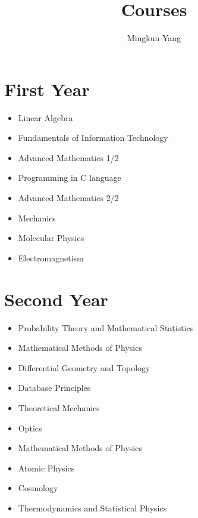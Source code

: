 \documentclass{article}
\begin{document}
\title{Courses}
\author{Mingkun Yang}
\maketitle

\section{First Year}
\begin{itemize}
	\item
		Linear Algebra
	\item
		Fundamentals of Information Technology
	\item
		Advanced Mathematics 1/2
	\item
		Programming in C language
	\item
		Advanced Mathematics 2/2
	\item
		Mechanics
	\item
		Molecular Physics
	\item
		Electromagnetism
\end{itemize}

\section{Second Year}
\begin{itemize}
	\item
		Probability Theory and Mathematical Statistics
	\item
		Mathematical Methods of Physics
	\item
		Differential Geometry and Topology
	\item
		Database Principles
	\item
		Theoretical Mechanics
	\item
		Optics
	\item
		Mathematical Methods of Physics
	\item
		Atomic Physics
	\item
		Cosmology
	\item
		Thermodynamics and Statistical Physics
\end{itemize}
\newpage
\end{document}
